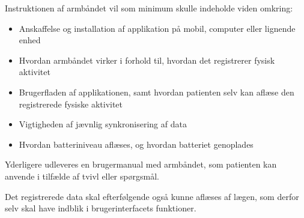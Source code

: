 Instruktionen af armbåndet vil som minimum skulle indeholde viden omkring: 
\begin{itemize}
\item Anskaffelse og installation af applikation på mobil, computer eller lignende enhed
\item Hvordan armbåndet virker i forhold til, hvordan det registrerer fysisk aktivitet 
\item Brugerfladen af applikationen, samt hvordan patienten selv kan aflæse den registrerede fysiske aktivitet
\item Vigtigheden af jævnlig synkronisering af data 
\item Hvordan batteriniveau aflæses, og hvordan batteriet genoplades 
\end{itemize} 

Yderligere udleveres en brugermanual med armbåndet, som patienten kan anvende i tilfælde af tvivl eller spørgsmål.   

Det registrerede data skal efterfølgende også kunne aflæses af lægen, som derfor selv skal have indblik i brugerinterfacets funktioner.

